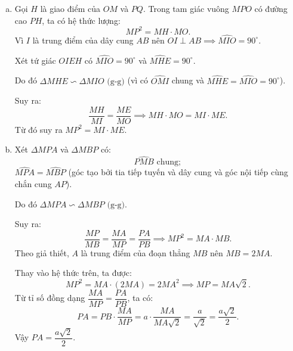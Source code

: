 \begin{bt}
{\begin{enumerate}[a)]
			Lại có $MP = MQ$ (tính chất hai tiếp tuyến cắt nhau) và $OP = OQ = R$ nên $OM$ là đường trung trực của đoạn thẳng $PQ$.
			
			Suy ra $OM \perp PQ$.
			\item Gọi $H$ là giao điểm của $OM$ và $PQ$. Trong tam giác vuông $MPO$ có đường cao $PH$, ta có hệ thức lượng:
			$$MP^2 = MH \cdot MO.$$
			Vì $I$ là trung điểm của dây cung $AB$ nên $OI \perp AB \implies \widehat{MIO} = 90^\circ$.
			
			Xét tứ giác $OIEH$ có $\widehat{MIO} = 90^\circ$ và $\widehat{MHE} = 90^\circ$.
			
			Do đó $\Delta MHE \backsim \Delta MIO\text{ (g-g)}$ (vì có $\widehat{OMI}$ chung và $\widehat{MHE} = \widehat{MIO} = 90^\circ$).
			
			Suy ra:
			$$\dfrac{MH}{MI} = \dfrac{ME}{MO} \implies MH \cdot MO = MI \cdot ME.$$
			Từ đó suy ra $MP^2 = MI \cdot ME$.
			\item Xét $\Delta MPA$ và $\Delta MBP$ có:
			$$\widehat{PMB}\text{ chung};$$
			$\widehat{MPA} = \widehat{MBP}$ (góc tạo bởi tia tiếp tuyến và dây cung và góc nội tiếp cùng chắn cung $AP$).
			
			Do đó $\Delta MPA \backsim \Delta MBP\text{ (g-g)}$.
			
			Suy ra:
			$$\dfrac{MP}{MB} = \dfrac{MA}{MP} = \dfrac{PA}{PB} \implies MP^2 = MA \cdot MB.$$
			Theo giả thiết, $A$ là trung điểm của đoạn thẳng $MB$ nên $MB = 2MA$.
			
			Thay vào hệ thức trên, ta được:
			$$MP^2 = MA \cdot (2MA) = 2MA^2 \implies MP = MA\sqrt{2}.$$
			Từ tỉ số đồng dạng $\dfrac{MA}{MP} = \dfrac{PA}{PB}$, ta có:
			$$PA = PB \cdot \dfrac{MA}{MP} = a \cdot \dfrac{MA}{MA\sqrt{2}} = \dfrac{a}{\sqrt{2}} = \dfrac{a\sqrt{2}}{2}.$$
			Vậy $PA = \dfrac{a\sqrt{2}}{2}$.
		\end{enumerate}
	}
\end{bt}
